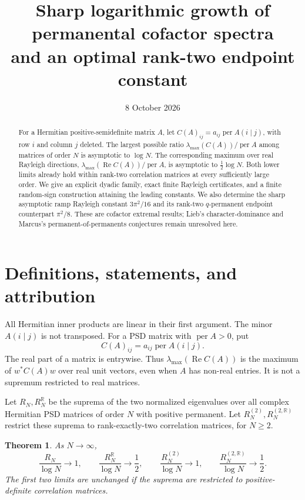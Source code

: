 \documentclass[11pt]{article}
\title{Sharp logarithmic growth of permanental cofactor spectra\\and an optimal rank-two endpoint constant}
\author{}
\date{8 October 2026}
\newtheorem{theorem}{Theorem}
\DeclareMathOperator{\per}{per}
\DeclareMathOperator{\Ree}{Re}
\begin{document}
\maketitle
\begin{abstract}
For a Hermitian positive-semidefinite matrix $A$, let
$C(A)_{ij}=a_{ij}\per A(i\mid j)$, with row $i$ and column $j$ deleted.
The largest possible ratio $\lambda_{\max}(C(A))/\per A$ among matrices of
order $N$ is asymptotic to $\log N$. The corresponding maximum over real
Rayleigh directions, $\lambda_{\max}(\Ree C(A))/\per A$, is asymptotic to
$\tfrac12\log N$. Both lower limits already hold within rank-two correlation
matrices at every sufficiently large order. We give an explicit dyadic family,
exact finite Rayleigh certificates, and a finite random-sign construction
attaining the leading constants. We also determine the sharp asymptotic ramp
Rayleigh constant $3\pi^2/16$ and its rank-two $q$-permanent endpoint counterpart
$\pi^2/8$. These are cofactor extremal results; Lieb's character-dominance and
Marcus's permanent-of-permanents conjectures remain unresolved here.
\end{abstract}

\section{Definitions, statements, and attribution}
All Hermitian inner products are linear in their first argument. The minor
$A(i\mid j)$ is not transposed. For a PSD matrix with $\per A>0$, put
\[
 C(A)_{ij}=a_{ij}\per A(i\mid j).
\]
The real part of a matrix is entrywise. Thus $\lambda_{\max}(\Ree C(A))$ is the
maximum of $w^*C(A)w$ over real unit vectors, even when $A$ has non-real entries.
It is not a supremum restricted to real matrices.

Let $R_N,R_N^{\mathbb R}$ be the suprema of the two normalized eigenvalues over
all complex Hermitian PSD matrices of order $N$ with positive permanent.
Let $R_N^{(2)},R_N^{(2,\mathbb R)}$ restrict these suprema to rank-exactly-two
correlation matrices, for $N\ge2$.
\begin{theorem}\label{thm:main}
As $N\to\infty$,
\[
 \frac{R_N}{\log N}\longrightarrow1,\qquad
 \frac{R_N^{\mathbb R}}{\log N}\longrightarrow\frac12,\qquad
 \frac{R_N^{(2)}}{\log N}\longrightarrow1,\qquad
 \frac{R_N^{(2,\mathbb R)}}{\log N}\longrightarrow\frac12.
\]
The first two limits are unchanged if the suprema are restricted to
positive-definite correlation matrices.
\end{theorem}
\end{document}
